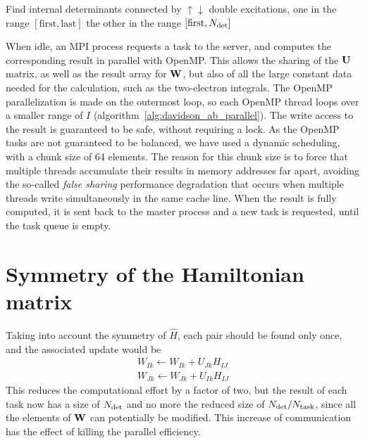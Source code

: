 \documentclass[./thesis.tex]{subfiles}
\begin{document}
\begin{algorithm}
\caption{Find internal determinants connected by $\uparrow\downarrow$ double excitations, one in the range $[\text{first}, \text{last}]$ the other in the range $[\text{first}, {N_\text{det}}]$}
\label{alg:davidson_ab_parallel}
\end{algorithm}

When idle, an MPI process requests a task to the server, and computes the
corresponding result in parallel with OpenMP.\cite{openmp} This allows
the sharing of the $\mathbf{U}$ matrix, as well as the result array for $\mathbf{W}$,
but also of all the large constant data needed for the calculation, such as
the two-electron integrals.
The OpenMP parallelization is made on the outermost loop, so each OpenMP thread
loops over a smaller range of $I$ (algorithm~\ref{alg:davidson_ab_parallel}).
The write
access to the result is guaranteed to be safe, without requiring a lock.
As the OpenMP tasks are not guaranteed to be balanced, we have used a
dynamic scheduling, with a chunk size of 64 elements. The reason for this
chunk size is to force that multiple threads accumulate their results in 
memory addresses far apart, avoiding the so-called \emph{false sharing}
performance degradation that occurs when multiple threads write simultaneously
in the same cache line.\cite{Bolosky1993Sep} 
When the result is fully computed, it is sent back to the master process and
a new task is requested, until the task queue is empty.


\section{Symmetry of the Hamiltonian matrix}


Taking into account the symmetry of $\widehat H$, each pair should be found only once, and the associated update would be
\begin{align}
W_{Ik} \gets W_{Ik} + U_{Jk} H_{IJ} \\
W_{Jk} \gets W_{Jk} + U_{Ik} H_{IJ}
\end{align}
This reduces the computational effort by a factor of two, but the result of
each task now has a size of ${N_\text{det}}$ and no more the reduced size of ${N_\text{det}} / N_\text{task}$,
since all the elements of $\mathbf{W}$ can potentially be modified.
This increase of communication has the effect of killing the parallel
efficiency.
\end{document}
